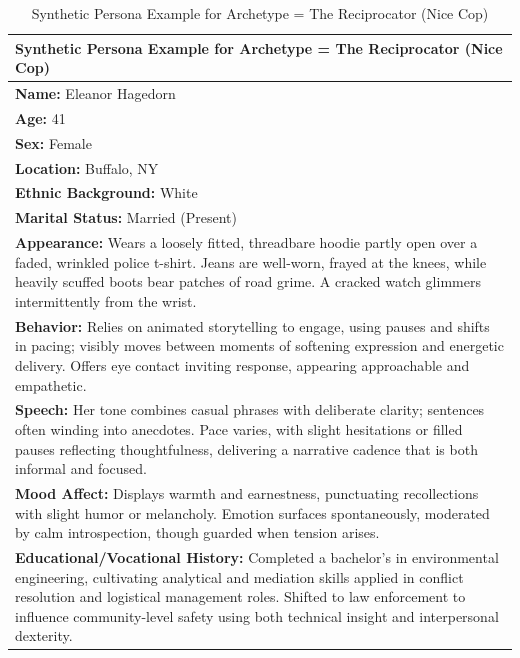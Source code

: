 \documentclass[11pt]{article}
\begin{document}
\begin{table}[ht]
\centering
\caption{Synthetic Persona Example for Archetype = The Reciprocator (Nice Cop)}
\label{tab:persona-example-4}
\scriptsize %
\begin{tabularx}{\textwidth}{X}
\toprule
\textbf{Synthetic Persona Example for Archetype = The Reciprocator (Nice Cop)} \\
\midrule
\textbf{Name:} Eleanor Hagedorn \\
\textbf{Age:} 41 \\
\textbf{Sex:} Female \\
\textbf{Location:} Buffalo, NY \\
\textbf{Ethnic Background:} White \\
\textbf{Marital Status:} Married (Present) \\[4pt]

\textbf{Appearance:} Wears a loosely fitted, threadbare hoodie partly open over a faded, wrinkled police t-shirt. Jeans are well-worn, frayed at the knees, while heavily scuffed boots bear patches of road grime. A cracked watch glimmers intermittently from the wrist. \\[4pt]

\textbf{Behavior:} Relies on animated storytelling to engage, using pauses and shifts in pacing; visibly moves between moments of softening expression and energetic delivery. Offers eye contact inviting response, appearing approachable and empathetic. \\[4pt]

\textbf{Speech:} Her tone combines casual phrases with deliberate clarity; sentences often winding into anecdotes. Pace varies, with slight hesitations or filled pauses reflecting thoughtfulness, delivering a narrative cadence that is both informal and focused. \\[4pt]

\textbf{Mood Affect:} Displays warmth and earnestness, punctuating recollections with slight humor or melancholy. Emotion surfaces spontaneously, moderated by calm introspection, though guarded when tension arises. \\[4pt]

\textbf{Educational/Vocational History:} Completed a bachelor's in environmental engineering, cultivating analytical and mediation skills applied in conflict resolution and logistical management roles. Shifted to law enforcement to influence community-level safety using both technical insight and interpersonal dexterity. \\[4pt]


\end{tabularx}
\end{table}
\end{document}
